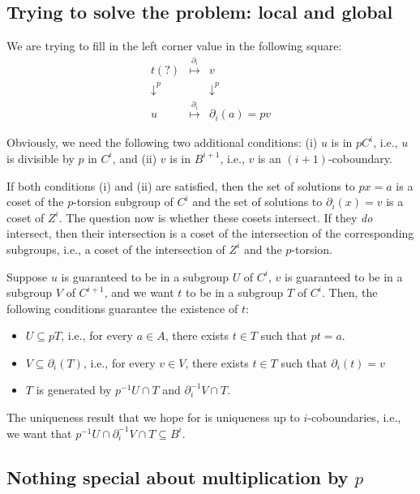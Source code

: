 \documentclass[10pt]{amsart}
\begin{document}
\subsection{Trying to solve the problem: local and global}

We are trying to fill in the left corner value in the following square:
\begin{eqnarray*}
  t (?) & \stackrel{\partial_i}{\mapsto} & v\\
  \downarrow^{p} & & \downarrow^{p}\\
  u & \stackrel{\partial_i}{\mapsto} & \partial_i(a) = pv
\end{eqnarray*}

Obviously, we need the following two additional conditions: (i) $u$ is
in $pC^i$, i.e., $u$ is divisible by $p$ in $C^i$, and (ii) $v$ is in
$B^{i+1}$, i.e., $v$ is an $(i + 1)$-coboundary.

If both conditions (i) and (ii) are satisfied, then the set of
solutions to $px = a$ is a coset of the $p$-torsion subgroup of $C^i$
and the set of solutions to $\partial_i(x) = v$ is a coset of
$Z^i$. The question now is whether these cosets intersect. If they
{\em do} intersect, then their intersection is a coset of the
intersection of the corresponding subgroups, i.e., a coset of the
intersection of $Z^i$ and the $p$-torsion.

Suppose $u$ is guaranteed to be in a subgroup $U$ of $C^i$, $v$ is
guaranteed to be in a subgroup $V$ of $C^{i+1}$, and we want $t$ to be
in a subgroup $T$ of $C^i$. Then, the following conditions guarantee
the existence of $t$:

\begin{itemize}
\item $U \subseteq pT$, i.e., for every $a \in A$, there exists $t \in
  T$ such that $pt = a$.
\item $V \subseteq \partial_i(T)$, i.e., for every $v \in V$, there
  exists $t \in T$ such that $\partial_i(t) = v$
\item $T$ is generated by $p^{-1}U \cap T$ and $\partial_i^{-1}V \cap
  T$.
\end{itemize}

The uniqueness result that we hope for is uniqueness up to
$i$-coboundaries, i.e., we want that $p^{-1}U \cap \partial_i^{-1}V
\cap T \subseteq B^i$.
\subsection{Nothing special about multiplication by $p$}
\end{document}
